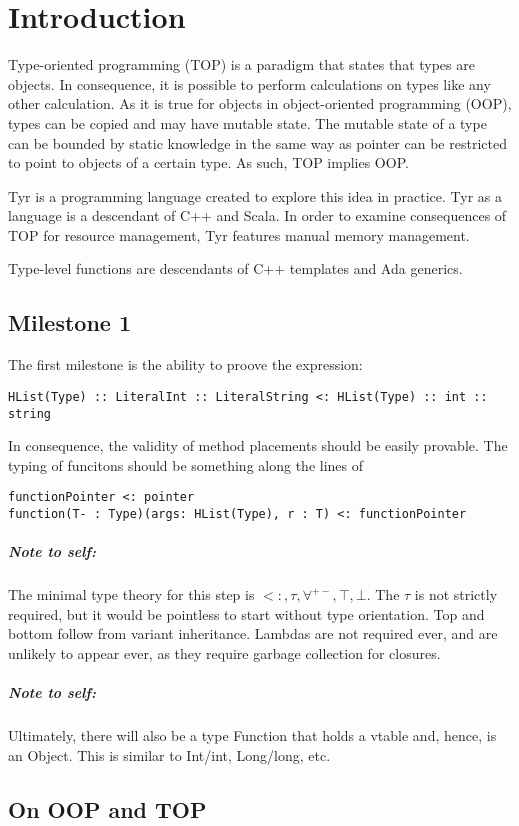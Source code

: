 
\section{Introduction}

Type-oriented programming (TOP) is a paradigm that states that types are objects.
In consequence, it is possible to perform calculations on types like any other calculation.
As it is true for objects in object-oriented programming (OOP), types can be copied and may have mutable state.
The mutable state of a type can be bounded by static knowledge in the same way as pointer can be restricted to point to objects of a certain type.
As such, TOP implies OOP.

Tyr is a programming language created to explore this idea in practice.
Tyr as a language is a descendant of C++ and Scala.
In order to examine consequences of TOP for resource management, Tyr features manual memory management.

Type-level functions are descendants of C++ templates and Ada generics.

\subsection{Milestone 1}
The first milestone is the ability to proove the expression:
\begin{verbatim}
HList(Type) :: LiteralInt :: LiteralString <: HList(Type) :: int :: string 
\end{verbatim}
In consequence, the validity of method placements should be easily provable.
The typing of funcitons should be something along the lines of
\begin{verbatim}
functionPointer <: pointer
function(T- : Type)(args: HList(Type), r : T) <: functionPointer
\end{verbatim}

\subparagraph{Note to self:}
The minimal type theory for this step is $<:, \tau, \forall^{+-}, \top, \bot$.
The $\tau$ is not strictly required, but it would be pointless to start without type orientation.
Top and bottom follow from variant inheritance.
Lambdas are not required ever, and are unlikely to appear ever, as they require garbage collection for closures.

\subparagraph{Note to self:}
Ultimately, there will also be a type Function that holds a vtable and, hence, is an Object.
This is similar to Int/int, Long/long, etc.


\subsection{On OOP and TOP}

